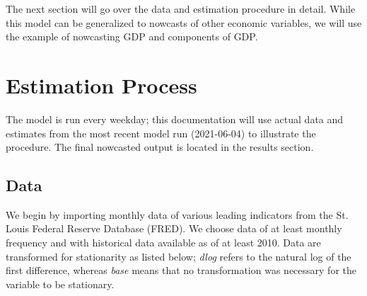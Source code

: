 \documentclass[11pt, letterpaper]{article}\usepackage[]{graphicx}\usepackage[]{color}
\begin{document}
The next section will go over the data and estimation procedure in detail. While this model can be generalized to nowcasts of other economic variables, we will use the example of nowcasting GDP and components of GDP.

\newpage
\section{Estimation Process}
The model is run every weekday; this documentation will use actual data and estimates from the most recent model run (2021-06-04) to illustrate the procedure. The final nowcasted output is located in the results section.

\subsection{Data}
We begin by importing monthly data of various leading indicators from the St. Louis Federal Reserve Database (FRED). We choose data of at least monthly frequency and with historical data available as of at least 2010. Data are transformed for stationarity as listed below; \textit{dlog} refers to the natural log of the first difference, whereas \textit{base} means that no transformation was necessary for the variable to be stationary.
\end{document}
